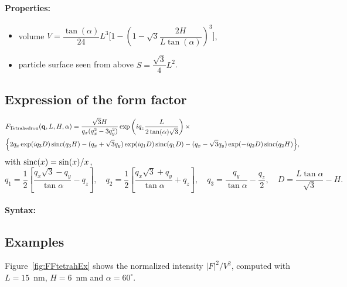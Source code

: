 \paragraph{Properties:}
\begin{itemize}
\item volume $V= \dfrac{\tan(\alpha)}{24} L^3\Big[1- (1 -
  \sqrt{3}\dfrac{2H}{L \tan(\alpha)} )^3\Big]$,
\item particle surface seen from above $S =\dfrac{\sqrt{3}}{4}L^2$.
\end{itemize}

\subsection{Expression of the form factor}

\begin{align*}
&F_{\rm{Tetrahedron}} (\mathbf{q}, L, H, \alpha)=\frac{\sqrt{3}H}{q_x (q_x^2-3q_y^2)}
\exp\left(iq_z \frac{L}{2\tan (\alpha)\sqrt{3}}\right) \times \\
&\Big\{2q_x \exp(iq_3 D)\operatorname{sinc}(q_3 H) - (q_x +\sqrt{3}q_y)
\exp(iq_1 D)\operatorname{sinc}(q_1 D) -(q_x-\sqrt{3}q_y)\exp(-iq_2
D)\operatorname{sinc}(q_2 H) \Big\}, 
\end{align*}
with $\operatorname{sinc}(x)=\sin(x)/x$,
\begin{equation*}
q_1  =\frac{1}{2}\left[\frac{q_x\sqrt{3} -q_y}{\tan \alpha}-q_z \right],
\quad q_2 = \frac{1}{2}\left[\frac{q_x\sqrt{3} +q_y}{\tan \alpha}+q_z
\right], \quad 
q_3 = \frac{q_y}{\tan \alpha} -\frac{q_z}{2}, \quad D = \frac{L \tan \alpha}{\sqrt{3}} -H.
\end{equation*}

\paragraph{Syntax:} 

\subsection{Examples}
Figure~\ref{fig:FFtetrahEx} shows the normalized intensity
$|F|^2/V^2$, computed with $L=15$~nm, $H=6$~nm and $\alpha =60
^{\circ}$.

